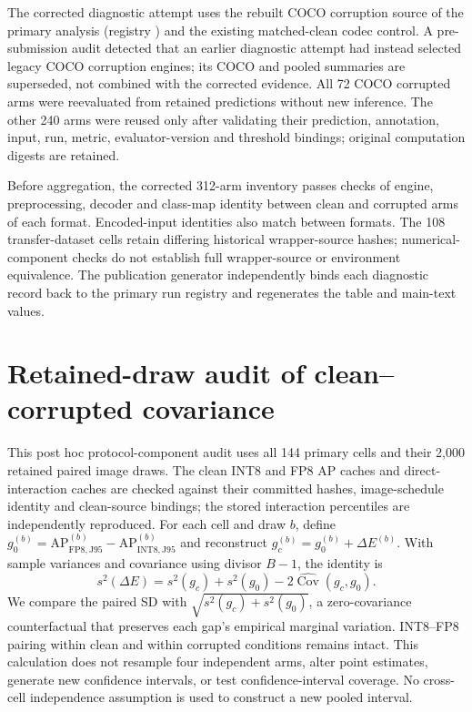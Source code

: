 \documentclass[10pt]{article}
\newcommand{\AP}{\mathrm{AP}}
\newcommand{\Jclean}{\mathrm{J95}}
\begin{document}
The corrected diagnostic attempt uses the rebuilt COCO corruption source of the primary analysis (registry ) and the existing matched-clean codec control. A pre-submission audit detected that an earlier diagnostic attempt had instead selected legacy COCO corruption engines; its COCO and pooled summaries are superseded, not combined with the corrected evidence. All 72 COCO corrupted arms were reevaluated from retained predictions without new inference. The other 240 arms were reused only after validating their prediction, annotation, input, run, metric, evaluator-version and threshold bindings; original computation digests are retained.

Before aggregation, the corrected 312-arm inventory passes checks of engine, preprocessing, decoder and class-map identity between clean and corrupted arms of each format. Encoded-input identities also match between formats. The 108 transfer-dataset cells retain differing historical wrapper-source hashes; numerical-component checks do not establish full wrapper-source or environment equivalence. The publication generator independently binds each diagnostic record back to the primary run registry and regenerates the table and main-text values.

\FloatBarrier
\section{Retained-draw audit of clean--corrupted covariance}

This post hoc protocol-component audit uses all 144 primary cells and their 2,000 retained paired image draws. The clean INT8 and FP8 AP caches and direct-interaction caches are checked against their committed hashes, image-schedule identity and clean-source bindings; the stored interaction percentiles are independently reproduced. For each cell and draw $b$, define $g_0^{(b)}=\AP_{\mathrm{FP8},\Jclean}^{(b)}-\AP_{\mathrm{INT8},\Jclean}^{(b)}$ and reconstruct $g_c^{(b)}=g_0^{(b)}+\Delta E^{(b)}$. With sample variances and covariance using divisor $B-1$, the identity is
\[
s^2(\Delta E)=s^2(g_c)+s^2(g_0)-2\widehat{\operatorname{Cov}}(g_c,g_0).
\]
We compare the paired SD with $\sqrt{s^2(g_c)+s^2(g_0)}$, a zero-covariance counterfactual that preserves each gap's empirical marginal variation. INT8--FP8 pairing within clean and within corrupted conditions remains intact. This calculation does not resample four independent arms, alter point estimates, generate new confidence intervals, or test confidence-interval coverage. No cross-cell independence assumption is used to construct a new pooled interval.
\end{document}
